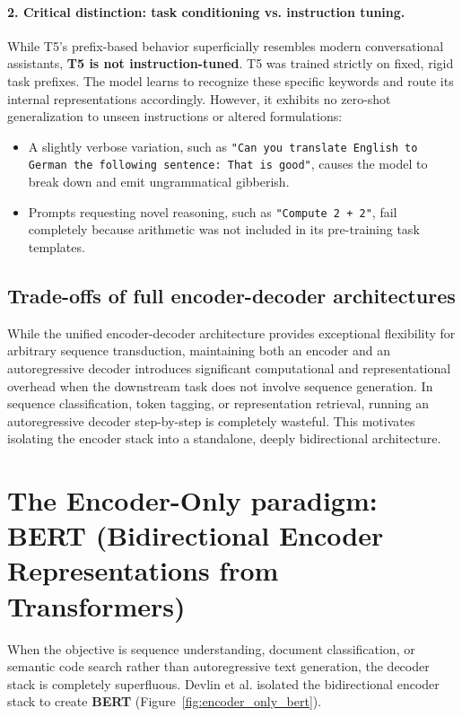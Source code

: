 \documentclass[../../main.tex]{subfiles}
\begin{document}
\paragraph{2. Critical distinction: task conditioning vs. instruction tuning.}
While T5's prefix-based behavior superficially resembles modern conversational assistants, \textbf{T5 is not instruction-tuned}.
T5 was trained strictly on fixed, rigid task prefixes. The model learns to recognize these specific keywords and route its internal representations accordingly. However, it exhibits no zero-shot generalization to unseen instructions or altered formulations:
\begin{itemize}
    \item A slightly verbose variation, such as \texttt{"Can you translate English to German the following sentence: That is good"}, causes the model to break down and emit ungrammatical gibberish.
    \item Prompts requesting novel reasoning, such as \texttt{"Compute 2 + 2"}, fail completely because arithmetic was not included in its pre-training task templates.
\end{itemize}

\subsection{Trade-offs of full encoder-decoder architectures}
\label{subsec:tradeoffs_enc_dec}
While the unified encoder-decoder architecture provides exceptional flexibility for arbitrary sequence transduction, maintaining both an encoder and an autoregressive decoder introduces significant computational and representational overhead when the downstream task does not involve sequence generation. In sequence classification, token tagging, or representation retrieval, running an autoregressive decoder step-by-step is completely wasteful. This motivates isolating the encoder stack into a standalone, deeply bidirectional architecture.

\clearpage
\section{The Encoder-Only paradigm: BERT (Bidirectional Encoder Representations from Transformers)}
\label{sec:encoder_only_bert}

When the objective is sequence understanding, document classification, or semantic code search rather than autoregressive text generation, the decoder stack is completely superfluous. Devlin et al. \cite{devlin2019} isolated the bidirectional encoder stack to create \textbf{BERT} (Figure~\ref{fig:encoder_only_bert}).
\end{document}
